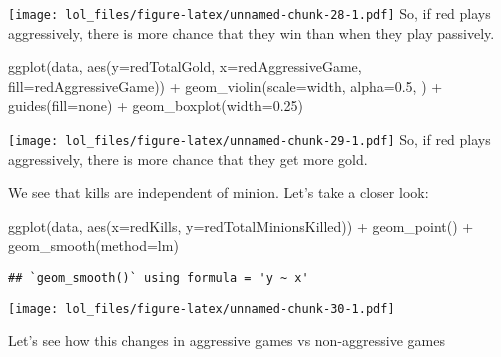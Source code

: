 \documentclass[
]{article}
\newenvironment{Shaded}{\begin{snugshade}}{\end{snugshade}}
\newcommand{\AttributeTok}[1]{\textcolor[rgb]{0.77,0.63,0.00}{#1}}
\newcommand{\FloatTok}[1]{\textcolor[rgb]{0.00,0.00,0.81}{#1}}
\newcommand{\FunctionTok}[1]{\textcolor[rgb]{0.00,0.00,0.00}{#1}}
\newcommand{\NormalTok}[1]{#1}
\newcommand{\SpecialCharTok}[1]{\textcolor[rgb]{0.00,0.00,0.00}{#1}}
\newcommand{\StringTok}[1]{\textcolor[rgb]{0.31,0.60,0.02}{#1}}
\begin{document}
\texttt{[image: lol\_files/figure-latex/unnamed-chunk-28-1.pdf]} So, if
red plays aggressively, there is more chance that they win than when
they play passively.

\begin{Shaded}
\begin{Highlighting}[]
\FunctionTok{ggplot}\NormalTok{(data, }\FunctionTok{aes}\NormalTok{(}\AttributeTok{y=}\NormalTok{redTotalGold, }\AttributeTok{x=}\NormalTok{redAggressiveGame, }\AttributeTok{fill=}\NormalTok{redAggressiveGame)) }\SpecialCharTok{+} 
  \FunctionTok{geom\_violin}\NormalTok{(}\AttributeTok{scale=}\StringTok{\textquotesingle{}width\textquotesingle{}}\NormalTok{, }\AttributeTok{alpha=}\FloatTok{0.5}\NormalTok{, ) }\SpecialCharTok{+}
  \FunctionTok{guides}\NormalTok{(}\AttributeTok{fill=}\StringTok{\textquotesingle{}none\textquotesingle{}}\NormalTok{) }\SpecialCharTok{+} 
  \FunctionTok{geom\_boxplot}\NormalTok{(}\AttributeTok{width=}\FloatTok{0.25}\NormalTok{)}
\end{Highlighting}
\end{Shaded}

\texttt{[image: lol\_files/figure-latex/unnamed-chunk-29-1.pdf]} So, if
red plays aggressively, there is more chance that they get more gold.

We see that kills are independent of minion. Let's take a closer look:

\begin{Shaded}
\begin{Highlighting}[]
\FunctionTok{ggplot}\NormalTok{(data, }\FunctionTok{aes}\NormalTok{(}\AttributeTok{x=}\NormalTok{redKills, }\AttributeTok{y=}\NormalTok{redTotalMinionsKilled)) }\SpecialCharTok{+} 
  \FunctionTok{geom\_point}\NormalTok{() }\SpecialCharTok{+}
  \FunctionTok{geom\_smooth}\NormalTok{(}\AttributeTok{method=}\StringTok{\textquotesingle{}lm\textquotesingle{}}\NormalTok{)}
\end{Highlighting}
\end{Shaded}

\begin{verbatim}
## `geom_smooth()` using formula = 'y ~ x'
\end{verbatim}

\texttt{[image: lol\_files/figure-latex/unnamed-chunk-30-1.pdf]}

Let's see how this changes in aggressive games vs non-aggressive games
\end{document}
